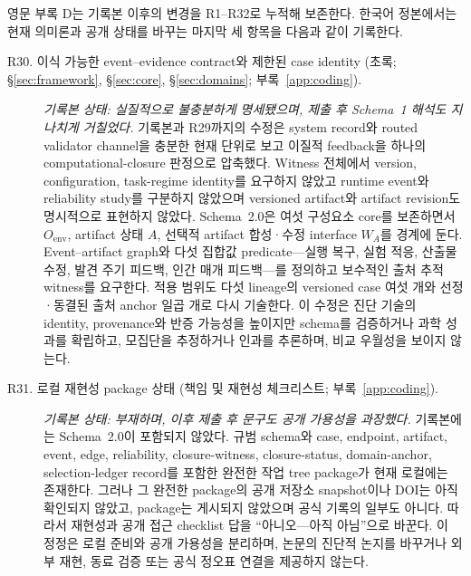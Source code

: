 \documentclass[11pt]{article}
\begin{document}
영문 부록 D는 기록본 이후의 변경을 R1--R32로 누적해 보존한다. 한국어 정본에서는 현재 의미론과 공개 상태를 바꾸는 마지막 세 항목을 다음과 같이 기록한다.

\begin{description}
  \item[R30. 이식 가능한 event--evidence contract와 제한된 case identity
  (초록; §\ref{sec:framework}, §\ref{sec:core}, §\ref{sec:domains}; 부록~\ref{app:coding}).]
  \emph{기록본 상태: 실질적으로 불충분하게 명세됐으며, 제출 후 Schema~1 해석도 지나치게 거칠었다.}
  기록본과 R29까지의 수정은 system record와 routed validator channel을 충분한 현재 단위로 보고 이질적 feedback을 하나의 computational-closure 판정으로 압축했다. Witness 전체에서 version, configuration, task-regime identity를 요구하지 않았고 runtime event와 reliability study를 구분하지 않았으며 versioned artifact와 artifact revision도 명시적으로 표현하지 않았다. Schema~2.0은 여섯 구성요소 core를 보존하면서 $O_{\mathrm{env}}$, artifact 상태 $A$, 선택적 artifact 합성·수정 interface $W_A$를 경계에 둔다. Event--artifact graph와 다섯 집합값 predicate---실행 복구, 실험 적응, 산출물 수정, 발견 주기 피드백, 인간 매개 피드백---를 정의하고 보수적인 출처 추적 witness를 요구한다. 적용 범위도 다섯 lineage의 versioned case 여섯 개와 선정·동결된 출처 anchor 일곱 개로 다시 기술한다. 이 수정은 진단 기술의 identity, provenance와 반증 가능성을 높이지만 schema를 검증하거나 과학 성과를 확립하고, 모집단을 추정하거나 인과를 추론하며, 비교 우월성을 보이지 않는다.

  \item[R31. 로컬 재현성 package 상태
  (책임 및 재현성 체크리스트; 부록~\ref{app:coding}).]
  \emph{기록본 상태: 부재하며, 이후 제출 후 문구도 공개 가용성을 과장했다.}
  기록본에는 Schema~2.0이 포함되지 않았다. 규범 schema와 case, endpoint, artifact, event, edge, reliability, closure-witness, closure-status, domain-anchor, selection-ledger record를 포함한 완전한 작업 tree package가 현재 로컬에는 존재한다. 그러나 그 완전한 package의 공개 저장소 snapshot이나 DOI는 아직 확인되지 않았고, package는 게시되지 않았으며 공식 기록의 일부도 아니다. 따라서 재현성과 공개 접근 checklist 답을 ``아니오---아직 아님''으로 바꾼다. 이 정정은 로컬 준비와 공개 가용성을 분리하며, 논문의 진단적 논지를 바꾸거나 외부 재현, 동료 검증 또는 공식 정오표 연결을 제공하지 않는다.


\end{description}
\end{document}
